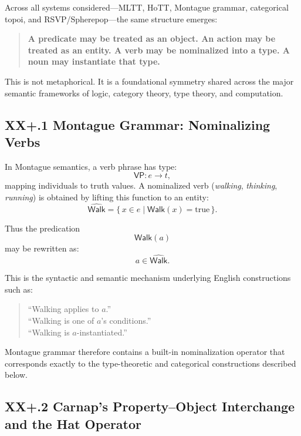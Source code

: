\documentclass[12pt,letterpaper]{article}
\begin{document}
Across all systems considered---MLTT, HoTT, Montague grammar, categorical
topoi, and RSVP/Spherepop---the same structure emerges:

\begin{quote}
\textbf{A predicate may be treated as an object.  
An action may be treated as an entity.  
A verb may be nominalized into a type.  
A noun may instantiate that type.}
\end{quote}

This is not metaphorical.  It is a foundational symmetry shared across the major
semantic frameworks of logic, category theory, type theory, and computation.

\subsection{XX+.1 Montague Grammar: Nominalizing Verbs}

In Montague semantics, a verb phrase has type:
\[
\mathsf{VP} : e \to t,
\]
mapping individuals to truth values.  A nominalized verb (\emph{walking},
\emph{thinking}, \emph{running}) is obtained by lifting this function to an
entity:
\[
\widehat{\mathsf{Walk}} = \{\,x \in e \mid \mathsf{Walk}(x) = \text{true}\,\}.
\]

Thus the predication
\[
\mathsf{Walk}(a)
\]
may be rewritten as:
\[
a \in \widehat{\mathsf{Walk}}.
\]

This is the syntactic and semantic mechanism underlying English constructions
such as:
\begin{quote}
``Walking applies to $a$.'' \\
``Walking is one of $a$'s conditions.'' \\
``Walking is $a$-instantiated.'' 
\end{quote}

Montague grammar therefore contains a built-in nominalization operator that
corresponds exactly to the type-theoretic and categorical constructions described
below.

\subsection{XX+.2 Carnap’s Property--Object Interchange and the Hat Operator}
\end{document}
